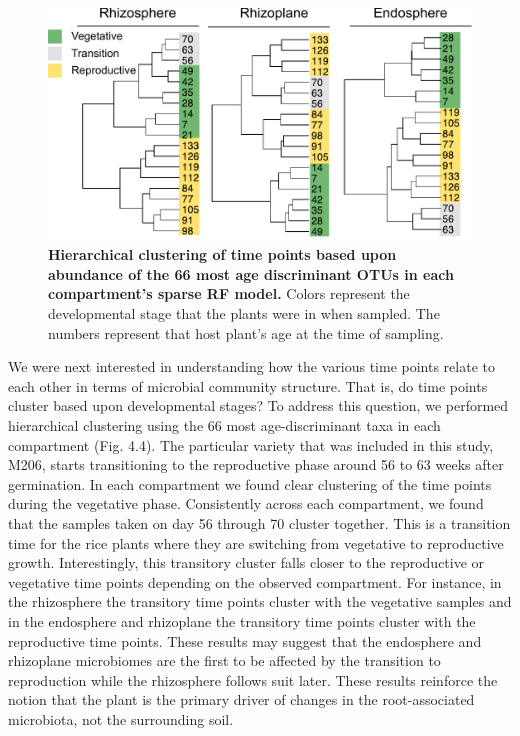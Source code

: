 \begin{figure}[h]
\centering
\includegraphics[width=5in]{Figures/rf_trees}
\caption[Figure 4.4]{\textbf{Hierarchical clustering of time points based upon abundance of the 66 most age discriminant OTUs in each compartment's sparse RF model.} Colors represent the developmental stage that the plants were in when sampled. The numbers represent that host plant's age at the time of sampling.}
\label{Figure 4.4}
\end{figure}

We were next interested in understanding how the various time points relate to each other in terms of microbial community structure. That is, do time points cluster based upon developmental stages? To address this question, we performed hierarchical clustering using the 66 most age-discriminant taxa in each compartment (Fig. 4.4). The particular variety that was included in this study, M206, starts transitioning to the reproductive phase around 56 to 63 weeks after germination. In each compartment we found clear clustering of the time points during the vegetative phase. Consistently across each compartment, we found that the samples taken on day 56 through 70 cluster together. This is a transition time for the rice plants where they are switching from vegetative to reproductive growth. Interestingly, this transitory cluster falls closer to the reproductive or vegetative time points depending on the observed compartment. For instance, in the rhizosphere the transitory time points cluster with the vegetative samples and in the endosphere and rhizoplane the transitory time points cluster with the reproductive time points. These results may suggest that the endosphere and rhizoplane microbiomes are the first to be affected by the transition to reproduction while the rhizosphere follows suit later. These results reinforce the notion that the plant is the primary driver of changes in the root-associated microbiota, not the surrounding soil.	

